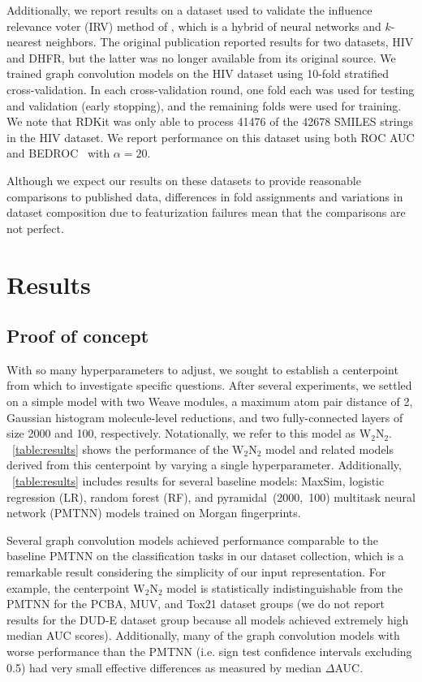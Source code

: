 Additionally, we report results on a dataset used to validate the influence
relevance voter (IRV) method of \citet{swamidass2009influence}, which is a
hybrid of neural networks and $k$-nearest neighbors. The original publication
reported results for two datasets, HIV and DHFR, but the latter was no longer
available from its original source. We trained graph convolution models on the
HIV dataset using 10-fold stratified cross-validation. In each cross-validation
round, one fold each was used for testing and validation (early stopping), and
the remaining folds were used for training. We note that RDKit was only able to
process \num{41476} of the \num{42678} SMILES strings in the HIV dataset.
We report performance on this dataset using both ROC AUC and
BEDROC~\citep{truchon2007evaluating} with $\alpha=20$.

Although we expect our results on these datasets to provide reasonable
comparisons to published data,  differences in fold assignments and variations
in dataset composition due to featurization failures mean that the comparisons
are not perfect.

\section{Results}
\label{sec:results}

\subsection{Proof of concept}

With so many hyperparameters to adjust, we sought to establish a centerpoint
from which to investigate specific questions. After several experiments, we
settled on a simple model with two Weave modules, a maximum atom pair distance
of 2, Gaussian histogram molecule-level reductions, and two fully-connected
layers of size 2000 and 100, respectively. Notationally, we refer to this model
as W$_2$N$_2$. \tablename~\ref{table:results} shows the performance of the
W$_2$N$_2$ model and related models derived from this centerpoint by varying a
single hyperparameter. Additionally, \tablename~\ref{table:results} includes
results for several baseline models: MaxSim, logistic regression (LR), random
forest (RF), and pyramidal~(2000,~100) multitask neural network (PMTNN) models
trained on Morgan fingerprints.

Several graph convolution models achieved performance comparable to the baseline
PMTNN on the classification tasks in our dataset collection, which is a
remarkable result considering the simplicity of our input representation. For
example, the centerpoint W$_2$N$_2$ model is statistically indistinguishable
from the PMTNN for the PCBA, MUV, and Tox21 dataset groups (we do not report
results for the DUD-E dataset group because all models achieved extremely high
median AUC scores). Additionally, many of the graph convolution models with
worse performance than the PMTNN (i.e. sign test confidence intervals
excluding 0.5) had very small effective differences as measured by median
$\Delta$AUC.

